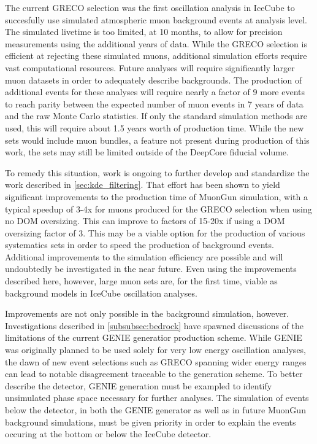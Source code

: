 The current GRECO selection was the first oscillation analysis in IceCube to succesfully use simulated atmospheric muon background events at analysis level.
The simulated livetime is too limited, at 10 months, to allow for precision measurements using the additional years of data.
While the GRECO selection is efficient at rejecting these simulated muons, additional simulation efforts require vast computational resources.
Future analyses will require significantly larger muon datasets in order to adequately describe backgrounds.
The production of additional events for these analyses will require nearly a factor of 9 more events to reach parity between the expected number of muon events in 7 years of data and the raw Monte Carlo statistics.
If only the standard simulation methods are used, this will require about 1.5 years worth of production time.
While the new sets would include muon bundles, a feature not present during production of this work, the sets may still be limited outside of the DeepCore fiducial volume.

To remedy this situation, work is ongoing to further develop and standardize the work described in \ref{sec:kde_filtering}. 
That effort has been shown to yield significant improvements to the production time of MuonGun simulation, with a typical speedup of 3-4x for muons produced for the GRECO selection when using no DOM oversizing.
This can improve to factors of 15-20x if using a DOM oversizing factor of 3.
This may be a viable option for the production of various systematics sets in order to speed the production of background events.
Additional improvements to the simulation efficiency are possible and will undoubtedly be investigated in the near future.
Even using the improvements described here, however, large muon sets are, for the first time, viable as background models in IceCube oscillation analyses.

Improvements are not only possible in the background simulation, however.
Investigations described in \ref{subsubsec:bedrock} have spawned discussions of the limitations of the current GENIE generatior production scheme.
While GENIE was originally planned to be used solely for very low energy oscillation analyses, the dawn of new event selections such as GRECO spanning wider energy ranges can lead to notable disagreement traceable to the generation scheme.
To better describe the detector, GENIE generation must be exampled to identify unsimulated phase space necessary for further analyses.
The simulation of events below the detector, in both the GENIE generator as well as in future MuonGun background simulations, must be given priority in order to explain the events occuring at the bottom or below the IceCube detector.



